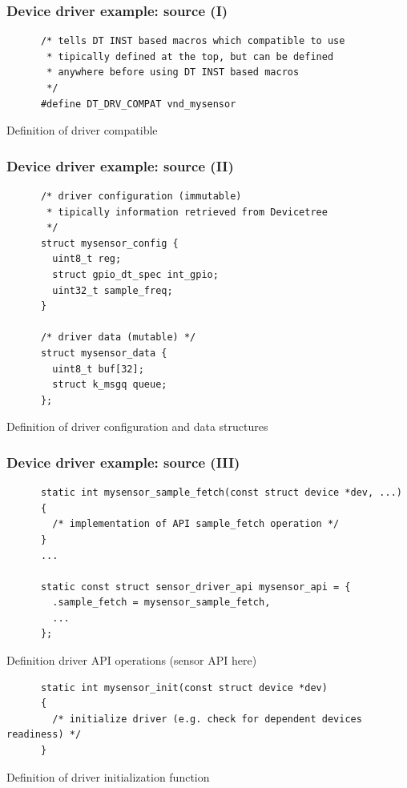 \documentclass[handout]{beamer}
\begin{document}
\begin{frame}[fragile]
  \frametitle{Device driver example: source (I)}

  \begin{listing}[H]
    \begin{verbatim}
      /* tells DT INST based macros which compatible to use
       * tipically defined at the top, but can be defined
       * anywhere before using DT INST based macros
       */
      #define DT_DRV_COMPAT vnd_mysensor
    \end{verbatim}
    \caption{Definition of driver compatible}
  \end{listing}
\end{frame}

\begin{frame}[fragile]
  \frametitle{Device driver example: source (II)}

  \begin{listing}[H]
    \begin{verbatim}
      /* driver configuration (immutable)
       * tipically information retrieved from Devicetree
       */
      struct mysensor_config {
        uint8_t reg;
        struct gpio_dt_spec int_gpio;
        uint32_t sample_freq;
      }

      /* driver data (mutable) */
      struct mysensor_data {
        uint8_t buf[32];
        struct k_msgq queue;
      };
    \end{verbatim}
    \caption{Definition of driver configuration and data structures}
  \end{listing}
\end{frame}

\begin{frame}[fragile]
  \frametitle{Device driver example: source (III)}

  \begin{listing}[H]
    \begin{verbatim}
      static int mysensor_sample_fetch(const struct device *dev, ...)
      {
        /* implementation of API sample_fetch operation */
      }
      ...

      static const struct sensor_driver_api mysensor_api = {
        .sample_fetch = mysensor_sample_fetch,
        ...
      };
    \end{verbatim}
    \caption{Definition driver API operations (sensor API here)}
  \end{listing}

  \begin{listing}[H]
    \begin{verbatim}
      static int mysensor_init(const struct device *dev)
      {
        /* initialize driver (e.g. check for dependent devices readiness) */
      }
    \end{verbatim}
    \caption{Definition of driver initialization function}
  \end{listing}
\end{frame}
\end{document}
